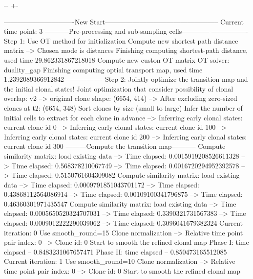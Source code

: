 \documentclass[letterpaper,10pt,english]{sphinxmanual}
\newlength\nbsphinxcodecellspacing
\begin{document}
{

\kern-\sphinxverbatimsmallskipamount\kern-\baselineskip
\kern+\FrameHeightAdjust\kern-\fboxrule
\vspace{\nbsphinxcodecellspacing}

\begin{sphinxVerbatim}[commandchars=\\\{\}]
-------------------------------New Start--------------------------------------------------
Current time point: 3
-----------Pre-processing and sub-sampling cells------------
----------------
Step 1: Use OT method for initialization
Compute new shortest path distance matrix
--> Chosen mode is distances
Finishing computing shortest-path distance, used time 29.862331867218018
Compute new custon OT matrix
OT solver: duality\_gap
Finishing computing optial transport map, used time 1.2392089366912842
----------------
Step 2: Jointly optimize the transition map and the initial clonal states!
Joint optimization that consider possibility of clonal overlap: v2
--> original clone shape: (6654, 414)
--> After excluding zero-sized clones at t2: (6654, 348)
Sort clones by size (small to large)
Infer the number of initial cells to extract for each clone in advance
--> Inferring early clonal states: current clone id 0
--> Inferring early clonal states: current clone id 100
--> Inferring early clonal states: current clone id 200
--> Inferring early clonal states: current clone id 300
---------Compute the transition map-----------
Compute similarity matrix: load existing data
--> Time elapsed:  0.0015919208526611328
--> Time elapsed:  0.568378210067749
--> Time elapsed:  0.0016720294952392578
--> Time elapsed:  0.5150761604309082
Compute similarity matrix: load existing data
--> Time elapsed:  0.0009791851043701172
--> Time elapsed:  0.43868112564086914
--> Time elapsed:  0.00109100341796875
--> Time elapsed:  0.46360301971435547
Compute similarity matrix: load existing data
--> Time elapsed:  0.0005650520324707031
--> Time elapsed:  0.3390321731567383
--> Time elapsed:  0.0009012222290039062
--> Time elapsed:  0.3096041679382324
Current iteration: 0
Use smooth\_round=15
Clone normalization
--> Relative time point pair index: 0
--> Clone id: 0
Start to smooth the refined clonal map
Phase I: time elapsed --  0.8483231067657471
Phase II: time elapsed --  0.850473165512085
Current iteration: 1
Use smooth\_round=10
Clone normalization
--> Relative time point pair index: 0
--> Clone id: 0
Start to smooth the refined clonal map

\end{sphinxVerbatim}}
\end{document}

